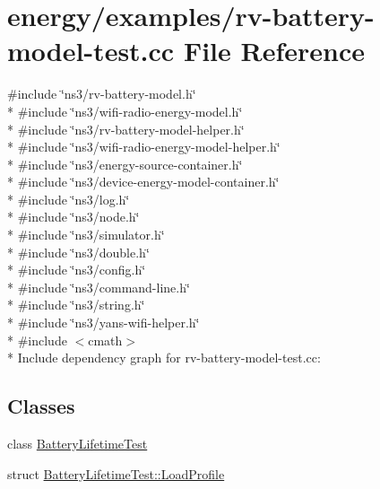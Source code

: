 \hypertarget{rv-battery-model-test_8cc}{}\section{energy/examples/rv-\/battery-\/model-\/test.cc File Reference}
\label{rv-battery-model-test_8cc}
{\ttfamily \#include \char`\"{}ns3/rv-\/battery-\/model.\+h\char`\"{}}\\*
{\ttfamily \#include \char`\"{}ns3/wifi-\/radio-\/energy-\/model.\+h\char`\"{}}\\*
{\ttfamily \#include \char`\"{}ns3/rv-\/battery-\/model-\/helper.\+h\char`\"{}}\\*
{\ttfamily \#include \char`\"{}ns3/wifi-\/radio-\/energy-\/model-\/helper.\+h\char`\"{}}\\*
{\ttfamily \#include \char`\"{}ns3/energy-\/source-\/container.\+h\char`\"{}}\\*
{\ttfamily \#include \char`\"{}ns3/device-\/energy-\/model-\/container.\+h\char`\"{}}\\*
{\ttfamily \#include \char`\"{}ns3/log.\+h\char`\"{}}\\*
{\ttfamily \#include \char`\"{}ns3/node.\+h\char`\"{}}\\*
{\ttfamily \#include \char`\"{}ns3/simulator.\+h\char`\"{}}\\*
{\ttfamily \#include \char`\"{}ns3/double.\+h\char`\"{}}\\*
{\ttfamily \#include \char`\"{}ns3/config.\+h\char`\"{}}\\*
{\ttfamily \#include \char`\"{}ns3/command-\/line.\+h\char`\"{}}\\*
{\ttfamily \#include \char`\"{}ns3/string.\+h\char`\"{}}\\*
{\ttfamily \#include \char`\"{}ns3/yans-\/wifi-\/helper.\+h\char`\"{}}\\*
{\ttfamily \#include $<$cmath$>$}\\*
Include dependency graph for rv-\/battery-\/model-\/test.cc\+:
\subsection*{Classes}
\begin{DoxyCompactItemize}
\item 
class \hyperlink{classBatteryLifetimeTest}{Battery\+Lifetime\+Test}
\item 
struct \hyperlink{structBatteryLifetimeTest_1_1LoadProfile}{Battery\+Lifetime\+Test\+::\+Load\+Profile}
\end{DoxyCompactItemize}
